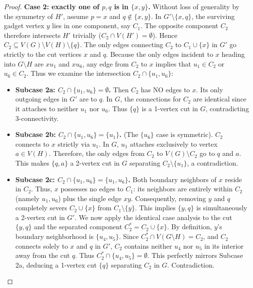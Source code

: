 \documentclass[12pt]{article}
\begin{document}
\begin{proof}
\textbf{Case 2: exactly one of $p, q$ is in $\{x, y\}$.}
Without loss of generality by the symmetry of $H'$, assume $p = x$ and $q \notin \{x, y\}$.
In $G' \setminus \{x, q\}$, the surviving gadget vertex $y$ lies in one component, say $C_1$.
The opposite component $C_2$ therefore intersects $H'$ trivially ($C_2 \cap V(H') = \emptyset$). Hence $C_2 \subseteq V(G) \setminus V(H) \setminus \{q\}$.
The only edges connecting $C_2$ to $C_1 \cup \{x\}$ in $G'$ go strictly to the cut vertices $x$ and $q$.
Because the only edges incident to $x$ heading into $G \setminus H$ are $xu_1$ and $xu_6$, any edge from $C_2$ to $x$ implies that $u_1 \in C_2$ or $u_6 \in C_2$. Thus we examine the intersection $C_2 \cap \{u_1, u_6\}$:
\begin{itemize}
    \item \textbf{Subcase 2a: $C_2 \cap \{u_1, u_6\} = \emptyset$.} Then $C_2$ has NO edges to $x$. Its only outgoing edges in $G'$ are to $q$. In $G$, the connections for $C_2$ are identical since it attaches to neither $u_1$ nor $u_6$. Thus $\{q\}$ is a 1-vertex cut in $G$, contradicting 3-connectivity.
    \item \textbf{Subcase 2b: $C_2 \cap \{u_1, u_6\} = \{u_1\}$.} (The $\{u_6\}$ case is symmetric). $C_2$ connects to $x$ strictly via $u_1$. In $G$, $u_1$ attaches exclusively to vertex $a \in V(H)$. Therefore, the only edges from $C_2$ to $V(G) \setminus C_2$ go to $q$ and $a$. This makes $\{q, a\}$ a 2-vertex cut in $G$ separating $C_2 \setminus \{u_1\}$, a contradiction.
    \item \textbf{Subcase 2c: $C_2 \cap \{u_1, u_6\} = \{u_1, u_6\}$.} Both boundary neighbors of $x$ reside in $C_2$. Thus, $x$ possesses no edges to $C_1$: its neighbors are entirely within $C_2$ (namely $u_1, u_6$) plus the single edge $xy$.
    Consequently, removing $y$ and $q$ completely severs $C_2 \cup \{x\}$ from $C_1 \setminus \{y\}$. This implies $\{y, q\}$ is simultaneously a 2-vertex cut in $G'$.
    We now apply the identical case analysis to the cut $\{y, q\}$ and the separated component $C_2^* = C_2 \cup \{x\}$.
    By definition, $y$'s boundary neighborhood is $\{u_4, u_5\}$. Since $C_2^* \cap V(G \setminus H) = C_2$, and $C_2$ connects solely to $x$ and $q$ in $G'$, $C_2$ contains neither $u_4$ nor $u_5$ in its interior away from the cut $q$. Thus $C_2^* \cap \{u_4, u_5\} = \emptyset$. This perfectly mirrors Subcase 2a, deducing a 1-vertex cut $\{q\}$ separating $C_2$ in $G$. Contradiction.
\end{itemize}


\end{proof}
\end{document}
